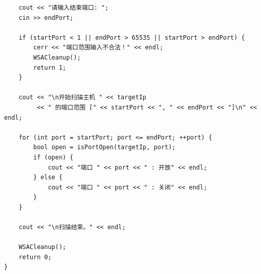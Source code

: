 \documentclass[12pt]{ctexart}
\begin{document}
\begin{verbatim}
    cout << "请输入结束端口: ";
    cin >> endPort;

    if (startPort < 1 || endPort > 65535 || startPort > endPort) {
        cerr << "端口范围输入不合法！" << endl;
        WSACleanup();
        return 1;
    }

    cout << "\n开始扫描主机 " << targetIp
         << " 的端口范围 [" << startPort << ", " << endPort << "]\n" << endl;

    for (int port = startPort; port <= endPort; ++port) {
        bool open = isPortOpen(targetIp, port);
        if (open) {
            cout << "端口 " << port << " : 开放" << endl;
        } else {
            cout << "端口 " << port << " : 关闭" << endl;
        }
    }

    cout << "\n扫描结束。" << endl;

    WSACleanup();
    return 0;
}
\end{verbatim}
\end{document}
